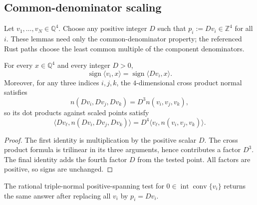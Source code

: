 %
%

\subsection{Common-denominator scaling}

Let $v_1,\ldots,v_N \in \mathbb{Q}^4$.  Choose any positive integer $D$
such that $p_i := Dv_i \in \mathbb{Z}^4$ for all $i$.  These lemmas need only
the common-denominator property; the referenced Rust paths choose the least
common multiple of the component denominators.

\begin{lemma}
\label{lem:rational-common-denominator-signs}
For every $x \in \mathbb{Q}^4$ and every integer $D > 0$,
\[
  \operatorname{sign}\langle v_i,x\rangle
  =
  \operatorname{sign}\langle Dv_i,x\rangle .
\]
Moreover, for any three indices $i,j,k$, the $4$-dimensional cross product
normal satisfies
\[
  n(Dv_i,Dv_j,Dv_k) = D^3 n(v_i,v_j,v_k),
\]
so its dot products against scaled points satisfy
\[
  \langle Dv_\ell,n(Dv_i,Dv_j,Dv_k)\rangle
  =
  D^4\langle v_\ell,n(v_i,v_j,v_k)\rangle .
\]
\end{lemma}

\begin{proof}
The first identity is multiplication by the positive scalar $D$.  The cross
product formula is trilinear in its three arguments, hence contributes a factor
$D^3$.  The final identity adds the fourth factor $D$ from the tested point.
All factors are positive, so signs are unchanged.
\end{proof}

\begin{lemma}
\label{lem:integer-scaled-origin-interior-test}
The rational triple-normal positive-spanning test for
$0 \in \operatorname{int}\operatorname{conv}\{v_i\}$ returns the same answer
after replacing all $v_i$ by $p_i = Dv_i$.
\end{lemma}

